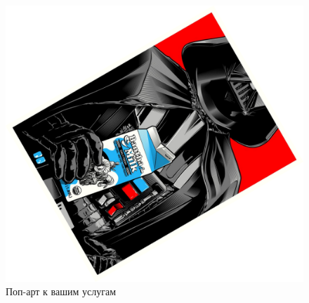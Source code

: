 \documentclass[14pt, a4paper]{article}  %
\begin{document}
\begin{figure}[!htb]
  \includegraphics[width=0.24\linewidth, angle=60,  height=1.75\linewidth, keepaspectratio]{pop9.pdf}
\endminipage
\caption{Поп-арт к вашим услугам}
\end{figure}
\end{document}
